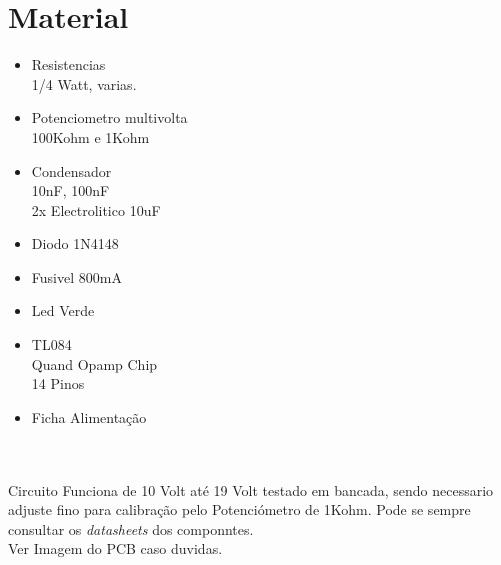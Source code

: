 \documentclass[titlepage, a4paper, 10pt, reqno, openany]{report}
\begin{document}
\section{Material}
\begin{minipage}[t]{.60\linewidth}
	\begin{itemize}
		\setlength\itemsep{-0.5em}
		\item Resistencias \\
		1/4 Watt, varias.
		\item Potenciometro multivolta \\
		100Kohm e 1Kohm
		\item Condensador \\
		10nF, 100nF  \\
		2x Electrolitico 10uF
		\item Diodo 1N4148 \\
		\item Fusivel 800mA \\
		\item Led Verde \\
	\end{itemize}
\end{minipage}
\begin{minipage}[t]{.31\linewidth}
	\begin{itemize}
		\setlength\itemsep{-0.5em}
		\item TL084 \\
		Quand Opamp Chip \\
		14 Pinos \\
		\item Ficha Alimentação \\
	\end{itemize}
\end{minipage}\\
\\
Circuito Funciona de 10 Volt até 19 Volt testado em bancada, sendo necessario adjuste fino para calibração pelo Potenciómetro de  1Kohm. 
Pode se sempre consultar os {\it datasheets} dos componntes.\\

Ver Imagem do PCB caso duvidas. \\
\end{document}
